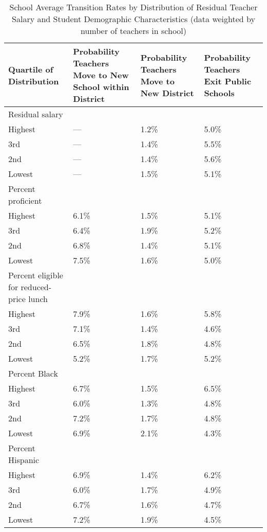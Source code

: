 \documentclass[12pt,]{article}
\begin{document}
\begin{table}[htbp]
\centering
\begin{tabular}{p{}p{}p{}p{}}
  \hline
Quartile of Distribution & Probability Teachers Move to New School within District & Probability Teachers Move to New District & Probability Teachers Exit Public Schools \\ 
  \hline
Residual salary & & & \\
\quad Highest & --- & 1.2\% & 5.0\% \\ 
  \quad 3rd & --- & 1.4\% & 5.5\% \\ 
  \quad 2nd & --- & 1.4\% & 5.6\% \\ 
  \quad Lowest & --- & 1.5\% & 5.1\% \\ 
Percent proficient & & & \\
  \quad Highest & 6.1\% & 1.5\% & 5.1\% \\ 
  \quad 3rd & 6.4\% & 1.9\% & 5.2\% \\ 
  \quad 2nd & 6.8\% & 1.4\% & 5.1\% \\ 
  \quad Lowest & 7.5\% & 1.6\% & 5.0\% \\ 
Percent eligible for reduced-price lunch & & & \\
  \quad Highest & 7.9\% & 1.6\% & 5.8\% \\ 
  \quad 3rd & 7.1\% & 1.4\% & 4.6\% \\ 
  \quad 2nd & 6.5\% & 1.8\% & 4.8\% \\ 
  \quad Lowest & 5.2\% & 1.7\% & 5.2\% \\ 
Percent Black & & & \\
  \quad Highest & 6.7\% & 1.5\% & 6.5\% \\ 
  \quad 3rd & 6.0\% & 1.3\% & 4.8\% \\ 
  \quad 2nd & 7.2\% & 1.7\% & 4.8\% \\ 
  \quad Lowest & 6.9\% & 2.1\% & 4.3\% \\ 
Percent Hispanic & & & \\
  \quad Highest & 6.9\% & 1.4\% & 6.2\% \\ 
  \quad 3rd & 6.0\% & 1.7\% & 4.9\% \\ 
  \quad 2nd & 6.7\% & 1.6\% & 4.7\% \\ 
  \quad Lowest & 7.2\% & 1.9\% & 4.5\% \\ 
   \hline
\end{tabular}
\caption{School Average Transition Rates by Distribution of Residual Teacher Salary and Student Demographic Characteristics (data weighted by number of teachers in school)} 
\label{tbl:change_by_quartile}
\end{table}
\end{document}
